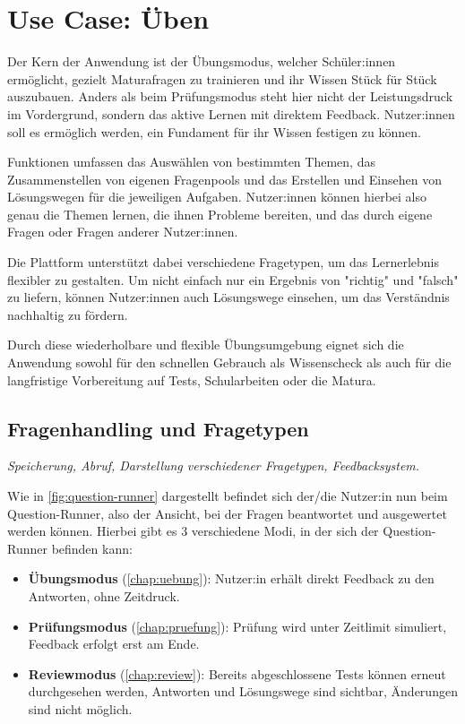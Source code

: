 \section{Use Case: Üben}

Der Kern der Anwendung ist der Übungsmodus, welcher Schüler:innen ermöglicht, gezielt
Maturafragen zu trainieren und ihr Wissen Stück für Stück auszubauen. Anders als beim
Prüfungsmodus steht hier nicht der Leistungsdruck im Vordergrund, sondern das aktive 
Lernen mit direktem Feedback. Nutzer:innen soll es ermöglich werden, ein Fundament für 
ihr Wissen festigen zu können. 

Funktionen umfassen das Auswählen von bestimmten Themen, das Zusammenstellen 
von eigenen Fragenpools und das Erstellen und Einsehen von Lösungswegen für die 
jeweiligen Aufgaben. Nutzer:innen können hierbei also genau die Themen lernen, die ihnen
Probleme bereiten, und das durch eigene Fragen oder Fragen anderer Nutzer:innen. 

Die Plattform unterstützt dabei verschiedene Fragetypen, um das Lernerlebnis flexibler zu 
gestalten. Um nicht einfach nur ein Ergebnis von "richtig" und "falsch" zu liefern, 
können Nutzer:innen auch Lösungswege einsehen, um das Verständnis nachhaltig zu fördern.

Durch diese wiederholbare und flexible Übungsumgebung eignet sich die Anwendung sowohl
für den schnellen Gebrauch als Wissenscheck als auch für die langfristige Vorbereitung
auf Tests, Schularbeiten oder die Matura.

\subsection{Fragenhandling und Fragetypen}
\setauthor{\firstauthor}
\textit{Speicherung, Abruf, Darstellung verschiedener Fragetypen, Feedbacksystem.}

Wie in \autoref{fig:question-runner} dargestellt befindet sich der/die Nutzer:in nun beim
Question-Runner, also der Ansicht, bei der Fragen beantwortet und ausgewertet werden können.
Hierbei gibt es 3 verschiedene Modi, in der sich der Question-Runner befinden kann:
\begin{itemize}
    \item \textbf{Übungsmodus} (\ref{chap:uebung}): 
        Nutzer:in erhält direkt Feedback zu den Antworten, ohne Zeitdruck.
    \item \textbf{Prüfungsmodus} (\ref{chap:pruefung}): 
        Prüfung wird unter Zeitlimit simuliert, Feedback erfolgt erst am Ende.
    \item \textbf{Reviewmodus} (\ref{chap:review}): 
        Bereits abgeschlossene Tests können erneut durchgesehen werden, 
        Antworten und Lösungswege sind sichtbar, Änderungen sind nicht möglich.
\end{itemize}

